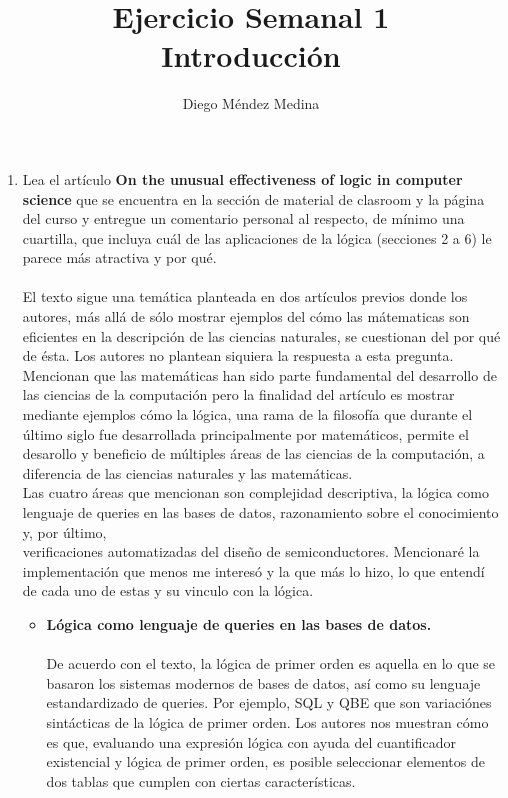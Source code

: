 \documentclass[8pt, letterpaper]{article}
\title{%
  Ejercicio Semanal 1 \\
  {\large{Introducción}}}
\author{Diego Méndez Medina}
\date{}
\begin{document}
\ttfamily
\maketitle
\rmfamily
\begin{enumerate}
\item Lea el artículo \textbf{On the unusual effectiveness of logic in computer science} que se encuentra en la sección de material de clasroom y la página del curso y entregue un comentario personal al respecto, de mínimo una cuartilla, que incluya cuál de las aplicaciones de la lógica (secciones 2 a 6) le parece más atractiva y por qué.\\\\
  \ttfamily
  El texto sigue una temática planteada en dos artículos previos donde los autores, más allá de sólo mostrar ejemplos del cómo las mátematicas son eficientes en la descripción de las ciencias naturales, se cuestionan del por qué de ésta. Los autores no plantean siquiera la respuesta a esta pregunta. Mencionan que las matemáticas han sido parte fundamental del desarrollo de las ciencias de la computación pero la finalidad del artículo es mostrar mediante ejemplos cómo la lógica, una rama de la filosofía que durante el último siglo fue desarrollada principalmente por matemáticos, permite el desarollo y beneficio de múltiples áreas de las ciencias de la computación, a diferencia de las ciencias naturales y las matemáticas.\\
  \hspace*{1cm} Las cuatro áreas que mencionan son complejidad descriptiva, la lógica como lenguaje de queries en las bases de datos, razonamiento sobre el conocimiento y, por último, \\verificaciones automatizadas del diseño de semiconductores. Mencionaré la implementación que menos me interesó y la que más lo hizo, lo que entendí de cada uno de estas y su vinculo con la lógica.\\
  \begin{itemize}
  \item \textbf{Lógica como lenguaje de queries en las bases de datos.}\\\\
    De acuerdo con el texto, la lógica de primer orden es aquella en lo que se basaron los sistemas modernos de bases de datos, así como su lenguaje estandardizado de queries. Por ejemplo, SQL y QBE que son variaciónes sintácticas de la lógica de primer orden. Los autores nos muestran cómo es que, evaluando una expresión lógica con ayuda del cuantificador existencial y lógica de primer orden, es posible seleccionar elementos de dos tablas que cumplen con ciertas características.\\

\end{itemize}
\end{enumerate}
\end{document}
